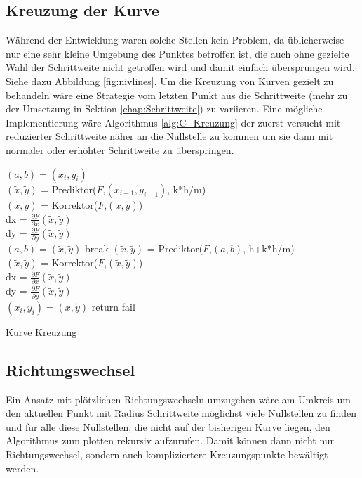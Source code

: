 \documentclass[a4paper,11pt,bibliography=totoc,listof=totoc,headinclude=true,cleardoublepage=empty,oneside]{scrartcl}
\newcommand{\diff}[2]{\frac{\partial #1}{\partial #2}}
\newcounter{satz}
\begin{document}
\subsection{Kreuzung der Kurve}  
Während der Entwicklung waren solche Stellen kein Problem, da üblicherweise nur eine sehr kleine Umgebung des Punktes betroffen ist, die auch ohne gezielte Wahl der Schrittweite nicht getroffen wird und damit einfach übersprungen wird. Siehe dazu Abbildung \ref{fig:nivlines}.
Um die Kreuzung von Kurven gezielt zu behandeln wäre eine Strategie vom letzten Punkt aus die Schrittweite (mehr zu der Umsetzung in Sektion \ref{chap:Schrittweite}) zu variieren. Eine mögliche Implementierung wäre Algorithmus \ref{alg:C_Kreuzung} der zuerst versucht mit reduzierter Schrittweite näher an die Nullstelle zu kommen um sie dann mit normaler oder erhöhter Schrittweite zu überspringen.
\begin{algorithm}[h]
	\label{alg:C_Kreuzung}
	$(a,b) = (x_i,y_i)$\\
	{
		$(\tilde x, \tilde y)$ = Prediktor($F$,$(x_{i-1},y_{i-1})$, k*h/m)\\
		$(\tilde x, \tilde y)$ = Korrektor($F$,$(\tilde x, \tilde y)$)\\		
		dx = $\diff{F}{x}(\tilde x, \tilde y)$\\
		dy = $\diff{F}{y}(\tilde x, \tilde y)$\\
		{
			$(a,b) = (\tilde x, \tilde y)$	
		}
		{
			break
		}
	}
	{
		$(\tilde x, \tilde y)$ = Prediktor($F$,$(a,b)$, h+k*h/m)\\
		$(\tilde x, \tilde y)$ = Korrektor($F$,$(\tilde x, \tilde y)$)\\		
		dx = $\diff{F}{x}(\tilde x, \tilde y)$\\
		dy = $\diff{F}{y}(\tilde x, \tilde y)$\\
		{
			$(x_i,y_i) = (\tilde x, \tilde y)$	
			return
		}
	}
	fail
	\caption{Kurve Kreuzung}
\end{algorithm}
\subsection{Richtungswechsel}
Ein Ansatz mit plötzlichen Richtungswechseln umzugehen wäre am Umkreis um den aktuellen Punkt mit Radius Schrittweite möglichst viele Nullstellen zu finden und für alle diese Nullstellen, die nicht auf der bisherigen Kurve liegen, den Algorithmus zum plotten rekursiv aufzurufen. Damit können dann nicht nur Richtungswechsel, sondern auch kompliziertere Kreuzungspunkte bewältigt werden.
\end{document}
